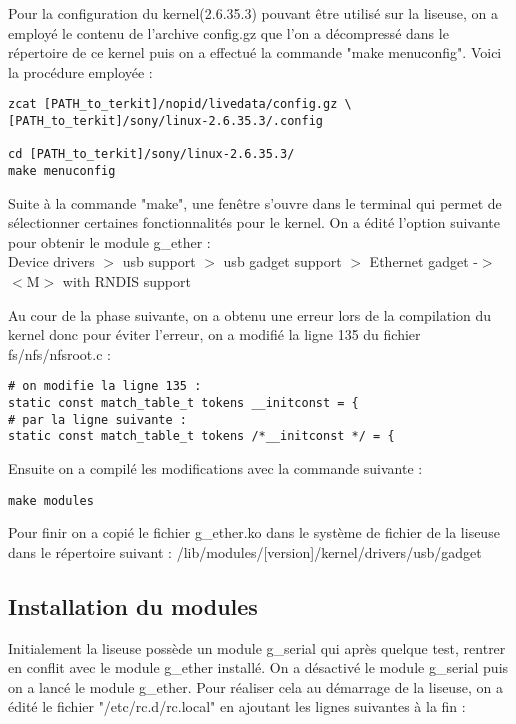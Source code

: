Pour la configuration du kernel(2.6.35.3) pouvant être utilisé sur la liseuse, on a employé le contenu de l'archive config.gz que l'on a décompressé dans le répertoire de ce kernel puis on a effectué la commande "make menuconfig". Voici la procédure employée :

\begin{lstlisting}
zcat [PATH_to_terkit]/nopid/livedata/config.gz \
[PATH_to_terkit]/sony/linux-2.6.35.3/.config

cd [PATH_to_terkit]/sony/linux-2.6.35.3/
make menuconfig
\end{lstlisting}

Suite à la commande "make", une fenêtre s'ouvre dans le terminal qui permet de sélectionner certaines fonctionnalités pour le kernel. On a édité l'option suivante pour obtenir le module g_ether : \\
Device drivers $>$ usb support $>$ usb gadget support $>$ Ethernet gadget -$>$ $<$M$>$ with RNDIS support

Au cour de la phase suivante, on a obtenu une erreur lors de la compilation du kernel donc pour éviter l'erreur, on a modifié la ligne 135 du fichier fs/nfs/nfsroot.c :

\begin{lstlisting}
# on modifie la ligne 135 :
static const match_table_t tokens __initconst = {
# par la ligne suivante :
static const match_table_t tokens /*__initconst */ = { 
\end{lstlisting} 

Ensuite on a compilé les modifications avec la commande suivante :

\begin{lstlisting}
make modules
\end{lstlisting}

Pour finir on a copié le fichier g_ether.ko dans le système de fichier de la liseuse dans le répertoire suivant : /lib/modules/[version]/kernel/drivers/usb/gadget
 
\subsection{Installation du modules}

Initialement la liseuse possède un module g_serial qui après quelque test, rentrer en conflit avec le module g_ether installé. On a désactivé le module g_serial puis on  a lancé le module g_ether. Pour réaliser cela au démarrage de la liseuse, on a édité le fichier "/etc/rc.d/rc.local" en ajoutant les lignes suivantes à la fin : 

